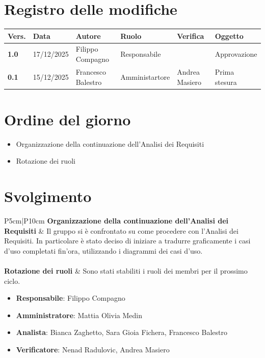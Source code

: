 \documentclass[a4paper,12pt]{article}
\begin{document}
    

    \newpage
    \section*{Registro delle modifiche}

    \begin{table}[h!]
        \begin{tabularx}{\textwidth}{|l|l|l|l|X|X|}
            \hline
            \textbf{Vers.} & \textbf{Data} & \textbf{Autore} & \textbf{Ruolo} & \textbf{Verifica} & \textbf{Oggetto} \\
            \hline
            \textbf{1.0} & 17/12/2025 & Filippo Compagno & Responsabile & & Approvazione \\
            \hline
            \textbf{0.1} & 15/12/2025 & Francesco Balestro & Amministartore & Andrea Masiero & Prima stesura \\
        \hline
        \end{tabularx}
    \end{table}

    \newpage
    \tableofcontents
    \newpage

    \section{Ordine del giorno} {
        \begin{itemize}
            \item Organizzazione della continuazione dell'Analisi dei Requisiti
            \item Rotazione dei ruoli
        \end{itemize}
    }

    \section{Svolgimento} {
        \begin{longtable}{P{5cm}|P{10cm}} 
            \textbf{Organizzazione della continuazione dell'Analisi dei Requisiti} & Il gruppo si è confrontato su come procedere con l'Analisi dei Requisiti. In particolare è stato deciso di iniziare a tradurre graficamente i casi d'uso completati fin'ora, utilizzando i diagrammi dei casi d'uso.\\\\
            \textbf{Rotazione dei ruoli} & Sono stati stabiliti i ruoli dei membri per il prossimo ciclo.
            \begin{itemize}
                \item \textbf{Responsabile}: Filippo Compagno
                \item \textbf{Amministratore}: Mattia Olivia Medin
                \item \textbf{Analista}: Bianca Zaghetto, Sara Gioia Fichera, Francesco Balestro
                \item \textbf{Verificatore}: Nenad Radulovic, Andrea Masiero
            \end{itemize}\\\\
        \end{longtable}
    }
\end{document}
